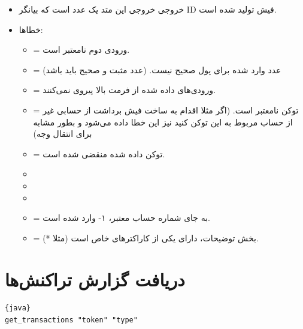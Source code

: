 \documentclass[]{article}
\begin{document}
\begin{itemize}
\item
\textcolor{CustomColor}{خروجی} خروجی این متد یک عدد است که بیانگر ID فیش تولید شده است.
\newpage
\item
\textcolor{CustomColor}{خطاها}:
\begin{itemize}
\item
{}  = ورودی دوم نامعتبر است.
\item
{} = عدد وارد شده برای پول صحیح نیست. (‌عدد مثبت و صحیح باید باشد)
\item
{} = ورودی‌های داده شده از فرمت بالا پیروی نمی‌کنند.
\item
{} = توکن نامعتبر است. (اگر مثلا اقدام به ساخت فیش برداشت از حسابی غیر از حساب مربوط به این توکن کنید نیز این خطا داده می‌شود و بطور مشابه برای انتقال وجه)
\item
{} = توکن داده شده منقضی شده است.
\item
{}
\item
{}
\item
{}
\item
{} = به جای شماره حساب معتبر، ۱- وارد شده است.
\item
{} = بخش توضیحات، دارای یکی از کاراکترهای خاص است (مثلا *).

\end{itemize}

\end{itemize}


\section*{{\titr دریافت گزارش تراکنش‌ها}}

\begin{latin}

\begin{lstlisting}{java}
get_transactions "token" "type"

\end{lstlisting}

\end{latin}
\end{document}
